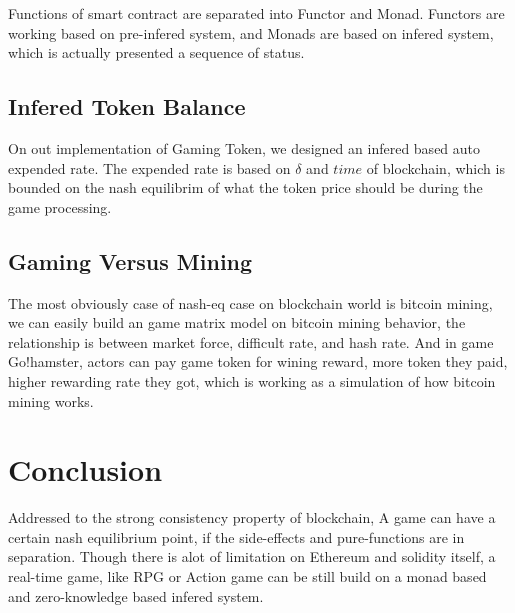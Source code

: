 \documentclass[twocolumn]{article}
\begin{document}
Functions of smart contract are separated into Functor and Monad. Functors are working based on pre-infered system, and Monads are based on infered system, which is actually presented a sequence of status.

\subsection {Infered Token Balance}

On out implementation of Gaming Token, we designed an infered based auto expended rate. The expended rate is based on $\delta$ and $time$ of blockchain, which is bounded on the nash equilibrim of what the token price should be during the game processing.

\subsection {Gaming Versus Mining}

The most obviously case of nash-eq case on blockchain world is bitcoin mining\cite{bitcoin}, we can easily build an game matrix model on bitcoin mining behavior, the relationship is between market force, difficult rate, and hash rate. And in game Go!hamster, actors can pay game token for wining reward, more token they paid, higher rewarding rate they got, which is working as a simulation of how bitcoin mining works.

\section {Conclusion}

Addressed to the strong consistency property of blockchain, A game can have a certain nash equilibrium point, if the side-effects and pure-functions are in separation. Though there is alot of limitation on Ethereum and solidity itself, a real-time game, like RPG or Action game can be still build on a monad based and zero-knowledge based infered system.



\end{document}
